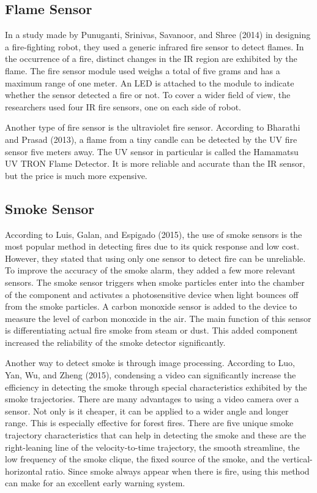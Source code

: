 \subsection{ Flame Sensor}
  
	In a study made by Punuganti, Srinivas, Savanoor, and Shree (2014) in designing a fire-fighting robot, they used a generic infrared fire sensor to detect flames. In the occurrence of a fire, distinct changes in the IR region are exhibited by the flame. The fire sensor module used weighs a total of five grams and has a maximum range of one meter. An LED is attached to the module to indicate whether the sensor detected a fire or not. To cover a wider field of view, the researchers used four IR fire sensors, one on each side of robot. 

	Another type of fire sensor is the ultraviolet fire sensor. According to Bharathi and Prasad (2013), a flame from a tiny candle can be detected by the UV fire sensor five meters away. The UV sensor in particular is called the Hamamatsu UV TRON Flame Detector. It is more reliable and accurate than the IR sensor, but the price is much more expensive.

\subsection{Smoke Sensor}

	According to Luis, Galan, and Espigado (2015), the use of smoke sensors is the most popular method in detecting fires due to its quick response and low cost. However, they stated that using only one sensor to detect fire can be unreliable. To improve the accuracy of the smoke alarm, they added a few more relevant sensors. The smoke sensor triggers when smoke particles enter into the chamber of the component and activates a photosensitive device when light bounces off from the smoke particles. A carbon monoxide sensor is added to the device to measure the level of carbon monoxide in the air. The main function of this sensor is differentiating actual fire smoke from steam or dust. This added component increased the reliability of the smoke detector significantly. 

	Another way to detect smoke is through image processing. According to Luo, Yan, Wu, and Zheng (2015), condensing a video can significantly increase the efficiency in detecting the smoke through special characteristics exhibited by the smoke trajectories. There are many advantages to using a video camera over a sensor. Not only is it cheaper, it can be applied to a wider angle and longer range. This is especially effective for forest fires. There are five unique smoke trajectory characteristics that can help in detecting the smoke and these are the right-leaning line of the velocity-to-time trajectory, the smooth streamline, the low frequency of the smoke clique, the fixed source of the smoke, and the vertical-horizontal ratio. Since smoke always appear when there is fire, using this method can make for an excellent early warning system.







